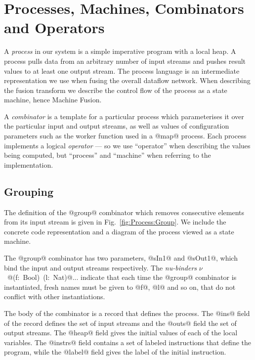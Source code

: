 \section{Processes, Machines, Combinators and Operators}
\label{s:Processes}

A \emph{process} in our system is a simple imperative program with a local heap. A process pulls data from an arbitrary number of input streams and pushes result values to at least one output stream. The process language is an intermediate representation we use when fusing the overall dataflow network. When describing the fusion transform we describe the control flow of the process as a state machine, hence Machine Fusion. 

A \emph{combinator} is a template for a particular process which parameterises it over the particular input and output streams, as well as values of configuration parameters such as the worker function used in a @map@ process. Each process implements a logical \emph{operator} --- so we use ``operator'' when describing the values being computed, but ``process'' and ``machine'' when referring to the implementation. 


\subsection{Grouping}

The definition of the @group@ combinator which removes consecutive elements from its input stream is given in Fig.~\ref{fig:Process:Group}. We include the concrete code representation and a diagram of the process viewed as a state machine.

The @group@ combinator has two parameters, @sIn1@ and @sOut1@, which bind the input and output streams respectively. The \emph{nu-binders} \mbox{$\nu$ @(f: Bool) (l: Nat)@...} indicate that each time the @group@ combinator is instantiated, fresh names must be given to @f@, @l@ and so on, that do not conflict with other instantiations. 

The body of the combinator is a record that defines the process. The @ins@ field of the record defines the set of input streams and the @outs@ field the set of output streams. The @heap@ field gives the initial values of each of the local variables. The @instrs@ field contains a set of labeled instructions that define the program, while the @label@ field gives the label of the initial instruction. 

